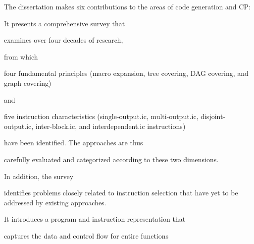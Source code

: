 The dissertation makes six contributions to the areas of \gls{code generation}
and \gls{CP}:
%
\begin{contributions}
  \item {}
    It presents a comprehensive survey that
    \begin{contributions}
      \item {}
        examines over four decades of research,
    \end{contributions}
    from which
    \begin{contributions}[resume]
      \item {}
        four fundamental principles (\gls{macro expansion}, \gls{tree covering},
        \gls{DAG covering}, and \gls{graph covering})
    \end{contributions}
    and
    \begin{contributions}[resume]
      \item {}
        five \gls{instruction} characteristics (\gls{single-output.ic},
        \gls{multi-output.ic}, \gls{disjoint-output.ic}, \gls{inter-block.ic},
        and \gls{interdependent.ic} \glspl{instruction})
    \end{contributions}
    have been identified. The approaches are thus
    \begin{contributions}[resume]
      \item {}
        carefully evaluated and categorized according to these two dimensions.
    \end{contributions}
    In addition, the survey
    \begin{contributions}[resume]
      \item {}
        identifies problems closely related to \gls{instruction selection} that
        have yet to be addressed by existing approaches.
    \end{contributions}
  \item {}
    It introduces a \gls{program} and \gls{instruction} representation that
    \begin{contributions}
      \item {}
        captures the data and control flow for entire \glspl{function}
    \end{contributions}

\end{contributions}
